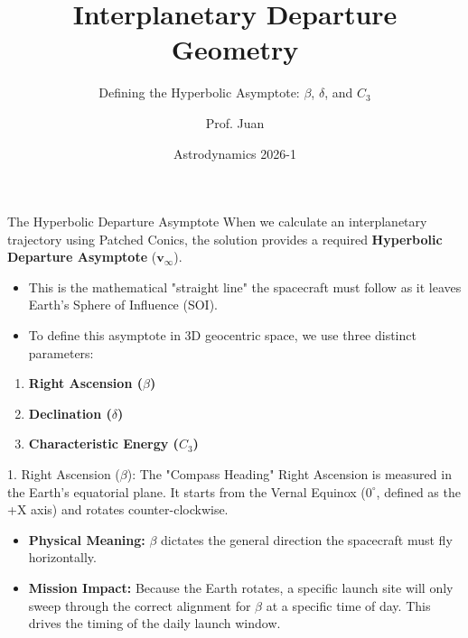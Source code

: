 \documentclass[11pt, aspectratio=169]{beamer}
\title[Interplanetary Departure]{Interplanetary Departure Geometry}
\subtitle{Defining the Hyperbolic Asymptote: $\beta$, $\delta$, and $C_3$}
\author[Prof. Juan]{Prof. Juan}
\institute[UdeA]{Universidad de Antioquia \\ Aerospace Engineering Program}
\date[Astrodynamics 2026-1]{Astrodynamics 2026-1}
\begin{document}
\begin{frame}
    \titlepage
\end{frame}

\begin{frame}{The Hyperbolic Departure Asymptote}
    When we calculate an interplanetary trajectory using Patched Conics, the solution provides a required \textbf{Hyperbolic Departure Asymptote} ($\boldsymbol{v}_\infty$).
    
    \vspace{0.4cm}
    \begin{itemize}
        \item This is the mathematical "straight line" the spacecraft must follow as it leaves Earth's Sphere of Influence (SOI). 
        \item To define this asymptote in 3D geocentric space, we use three distinct parameters:
    \end{itemize}
    
    \vspace{0.4cm}
    \begin{enumerate}
        \item \textbf{Right Ascension ($\beta$)}
        \item \textbf{Declination ($\delta$)}
        \item \textbf{Characteristic Energy ($C_3$)}
    \end{enumerate}
\end{frame}

\begin{frame}{1. Right Ascension ($\beta$): The "Compass Heading"}
    Right Ascension is measured in the Earth's equatorial plane. It starts from the Vernal Equinox ($0^\circ$, defined as the +X axis) and rotates counter-clockwise.
    
    \vspace{0.5cm}
    \begin{itemize}
        \item \textbf{Physical Meaning:} $\beta$ dictates the general direction the spacecraft must fly horizontally. 
        \vspace{0.3cm}
        \item \textbf{Mission Impact:} Because the Earth rotates, a specific launch site will only sweep through the correct alignment for $\beta$ at a specific time of day. This drives the timing of the daily launch window.
    \end{itemize}
\end{frame}
\end{document}

